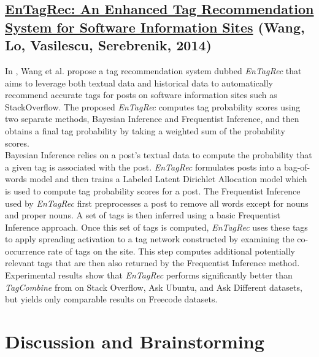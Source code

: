 \documentclass[11pt, final]{article}
\newcommand{\br}[1][.75]{\ \\[#1\baselineskip]}
\begin{document}
\subsection{\href{http://conferences.computer.org/icsme/2014/papers/6146a291.pdf}{EnTagRec: An Enhanced Tag Recommendation System for Software Information Sites} (Wang, Lo, Vasilescu, Serebrenik, 2014)}

In \cite{5}, Wang et al. propose a tag recommendation system dubbed \textit{EnTagRec} that aims to leverage both textual data and historical data to automatically recommend accurate tags for posts on software information sites such as StackOverflow. The proposed \textit{EnTagRec} computes tag probability scores using two separate methods, Bayesian Inference and Frequentist Inference, and then obtains a final tag probability by taking a weighted sum of the probability scores.\br
Bayesian Inference relies on a post's textual data to compute the probability that a given tag is associated with the post. \textit{EnTagRec} formulates posts into a bag-of-words model and then trains a Labeled Latent Dirichlet Allocation model which is used to compute tag probability scores for a post. The Frequentist Inference used by \textit{EnTagRec} first preprocesses a post to remove all words except for nouns and proper nouns. A set of tags is then inferred using a basic Frequentist Inference approach. Once this set of tags is computed, \textit{EnTagRec} uses these tags to apply spreading activation to a tag network constructed by examining the co-occurrence rate of tags on the site. This step computes additional potentially relevant tags that are then also returned by the Frequentist Inference method.\br
Experimental results show that \textit{EnTagRec} performs significantly better than \textit{TagCombine} from \cite{1} on Stack Overflow, Ask Ubuntu, and Ask Different datasets, but yields only comparable results on Freecode datasets.

\section{Discussion and Brainstorming}
\end{document}
